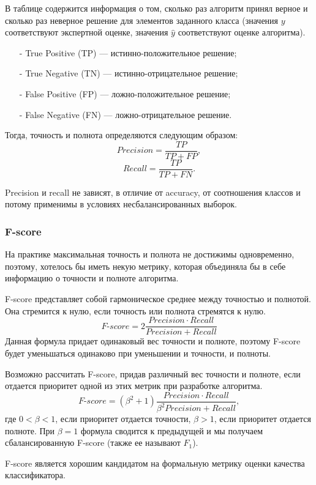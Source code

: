 \documentclass[14pt, a4paper, oneside]{extarticle}
\begin{document}
В таблице содержится информация о том, сколько раз алгоритм принял верное и сколько раз неверное решение для элементов заданного класса (значения $y$ соответствуют экспертной оценке, значения $\hat{y}$ соответствуют оценке алгоритма).

\begin{itemize}
    \item[-] True Positive (TP) --- истинно-положительное решение;
    \item[-] True Negative (TN) --- истинно-отрицательное решение;
    \item[-] False Positive (FP) --- ложно-положительное решение;
    \item[-] False Negative (FN) --- ложно-отрицательное решение.
\end{itemize}

Тогда, точность и полнота определяются следующим образом:
$$Precision = \frac{TP}{TP+FP},$$
$$Recall = \frac{TP}{TP+FN}.$$

Precision и recall не зависят, в отличие от accuracy, от соотношения классов и потому применимы в условиях несбалансированных выборок.

\subsubsection{F-score}
На практике максимальная точность и полнота не достижимы одновременно, поэтому, хотелось бы иметь некую метрику, которая объединяла бы в себе информацию о точности и полноте алгоритма.

F-score представляет собой гармоническое среднее между точностью и полнотой. Она стремится к нулю, если точность или полнота стремятся к нулю.
$$F\mbox{-}score = 2 \frac{Precision \cdot Recall}{Precision + Recall}$$
Данная формула придает одинаковый вес точности и полноте, поэтому F-score будет уменьшаться одинаково при уменьшении и точности, и полноты.

Возможно рассчитать F-score, придав различный вес точности и полноте, если отдается приоритет одной из этих метрик при разработке алгоритма.
$$F\mbox{-}score = (\beta^2 + 1) \frac{Precision \cdot Recall}{\beta^2 Precision + Recall},$$
где $0 < \beta < 1$, если приоритет отдается точности, $\beta > 1$, если приоритет отдается полноте. При $\beta = 1$ формула сводится к предыдущей и мы получаем сбалансированную F-score (также ее называют $F_1$).

F-score является хорошим кандидатом на формальную метрику оценки качества классификатора.
\end{document}

